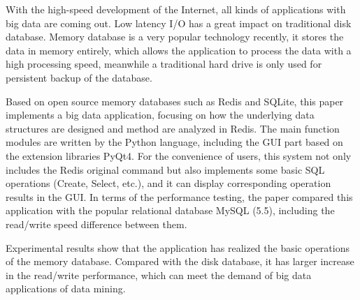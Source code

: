 \begin{abstracte}
With the high-speed development of the Internet, all kinds of applications with big data are coming out. Low latency I/O has a great impact on traditional disk database. Memory database is a very popular technology recently, it stores the data in memory entirely, which allows the application to process the data with a high processing speed, meanwhile a traditional hard drive is only used for persistent backup of the database.

Based on open source memory databases such as Redis and SQLite, this paper implements a big data application, focusing on how the underlying data structures are designed and method are analyzed in Redis. The main function modules are written by the Python language, including the GUI part based on the extension libraries PyQt4. For the convenience of users, this system not only includes the Redis original command but also implements some basic SQL operations (Create, Select, etc.), and it can display corresponding operation results in the GUI. In terms of the performance testing, the paper compared this application with the popular relational database MySQL (5.5), 
including the read/write speed difference between them.

Experimental results show that the application has realized the basic operations of the memory database. Compared with the disk database, it has larger increase in the read/write performance, which can meet the demand of big data applications of data mining.

\end{abstracte}
